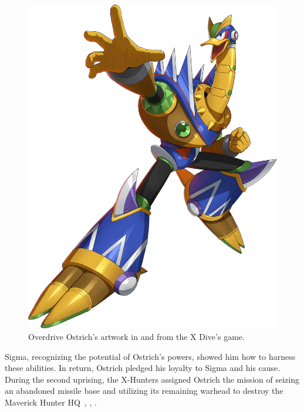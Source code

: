 \begin{figure}[htp]
	\includegraphics[height=\portraitsize]{figures/X2/Overdrive_ostrich/XOverdrive_Ostrich.png}
	\caption{Overdrive Ostrich's artwork in \cite{book:MMX_Complete_art} and from the X Dive's game.}
\end{figure} Sigma, recognizing the potential of Ostrich's powers, showed him how to harness these abilities. In return, Ostrich pledged his loyalty to Sigma and his cause. During the second uprising, the X-Hunters assigned Ostrich the mission of seizing an abandoned missile base and utilizing its remaining warhead to destroy the Maverick Hunter HQ~\cite{Xcoll1:Manual_X2}, \cite{wayback:X2_resources}, \cite{wiki:Overdrive_Ostrich}.

